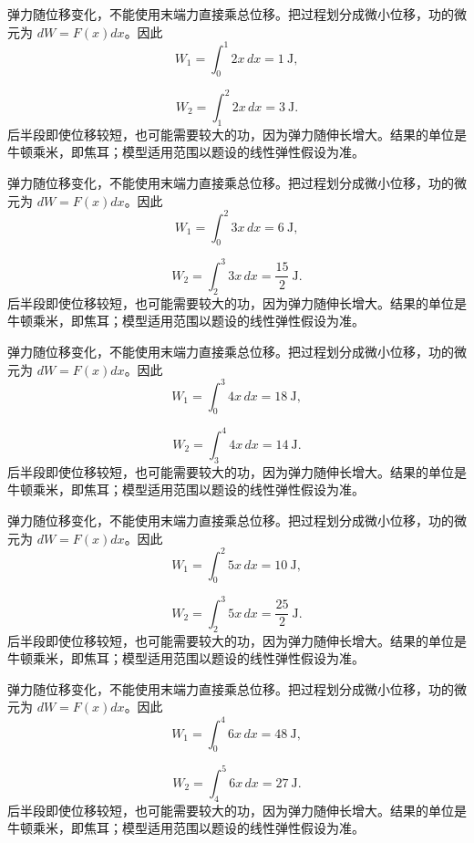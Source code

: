 \documentclass[12pt,fontset=fandol]{ctexart}
\begin{document}
\begin{solve}\label{ans:c21q19}
弹力随位移变化，不能使用末端力直接乘总位移。把过程划分成微小位移，功的微元为 $dW=F(x)dx$。因此
\[
W_1=\int_0^{1}2x\,dx=1\ \mathrm{J},
\]

\[
W_2=\int_{1}^{2}2x\,dx=3\ \mathrm{J}.
\]
后半段即使位移较短，也可能需要较大的功，因为弹力随伸长增大。结果的单位是牛顿乘米，即焦耳；模型适用范围以题设的线性弹性假设为准。
\end{solve}

\begin{solve}\label{ans:c21q20}
弹力随位移变化，不能使用末端力直接乘总位移。把过程划分成微小位移，功的微元为 $dW=F(x)dx$。因此
\[
W_1=\int_0^{2}3x\,dx=6\ \mathrm{J},
\]

\[
W_2=\int_{2}^{3}3x\,dx=\frac{15}{2}\ \mathrm{J}.
\]
后半段即使位移较短，也可能需要较大的功，因为弹力随伸长增大。结果的单位是牛顿乘米，即焦耳；模型适用范围以题设的线性弹性假设为准。
\end{solve}

\begin{solve}\label{ans:c21q21}
弹力随位移变化，不能使用末端力直接乘总位移。把过程划分成微小位移，功的微元为 $dW=F(x)dx$。因此
\[
W_1=\int_0^{3}4x\,dx=18\ \mathrm{J},
\]

\[
W_2=\int_{3}^{4}4x\,dx=14\ \mathrm{J}.
\]
后半段即使位移较短，也可能需要较大的功，因为弹力随伸长增大。结果的单位是牛顿乘米，即焦耳；模型适用范围以题设的线性弹性假设为准。
\end{solve}

\begin{solve}\label{ans:c21q22}
弹力随位移变化，不能使用末端力直接乘总位移。把过程划分成微小位移，功的微元为 $dW=F(x)dx$。因此
\[
W_1=\int_0^{2}5x\,dx=10\ \mathrm{J},
\]

\[
W_2=\int_{2}^{3}5x\,dx=\frac{25}{2}\ \mathrm{J}.
\]
后半段即使位移较短，也可能需要较大的功，因为弹力随伸长增大。结果的单位是牛顿乘米，即焦耳；模型适用范围以题设的线性弹性假设为准。
\end{solve}

\begin{solve}\label{ans:c21q23}
弹力随位移变化，不能使用末端力直接乘总位移。把过程划分成微小位移，功的微元为 $dW=F(x)dx$。因此
\[
W_1=\int_0^{4}6x\,dx=48\ \mathrm{J},
\]

\[
W_2=\int_{4}^{5}6x\,dx=27\ \mathrm{J}.
\]
后半段即使位移较短，也可能需要较大的功，因为弹力随伸长增大。结果的单位是牛顿乘米，即焦耳；模型适用范围以题设的线性弹性假设为准。
\end{solve}
\end{document}
